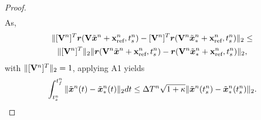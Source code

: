 \begin{proof}
\begin{multline*}
\end{multline*}
As, 
\begin{multline*}
\| [\mathbf {V}^{n}]^T \boldsymbol r( \mathbf {V} \tilde{\boldsymbol x}^{n} + \mathbf{x}_\text{ref}^{n} , {t_s^{n}}) - 
 [\mathbf {V}^{n}]^T \boldsymbol r( \mathbf {V}^{n} \tilde{\boldsymbol x}_{*}^{n} + \mathbf{x}_\text{ref}^{n}, {t_s^{n}}  ) \|_2
\le \\
 \| [\mathbf {V}^{n}]^T \|_2 \|  \boldsymbol r( \mathbf {V}^{n} \tilde{\boldsymbol x}^{n} + \mathbf{x}_\text{ref}^{n} , {t_s^{n}}) - 
  \boldsymbol r( \mathbf {V}^{n} \tilde{\boldsymbol x}_{*}^{n} + \mathbf{x}_\text{ref}^{n} , {t_s^{n}}  ) \|_2,
\end{multline*}
with $\| [\mathbf {V}^{n}]^T \|_2 = 1$, applying A1 yields
\begin{equation}\label{eq:ustarbound}
\int_{t_s^{n}}^{t_f^{n}} \| \tilde{\boldsymbol x}^{n}(t) - \tilde{\boldsymbol x}_{*}^{n}(t) \|_2 dt 
\le  \Delta T^{n} \sqrt{1 + \kappa} \| \tilde{\boldsymbol x}^{n}(t_s^{n}) - \tilde{\boldsymbol x}_{*}^{n}(t_s^{n} )  \|_2.
\end{equation}

\end{proof}
